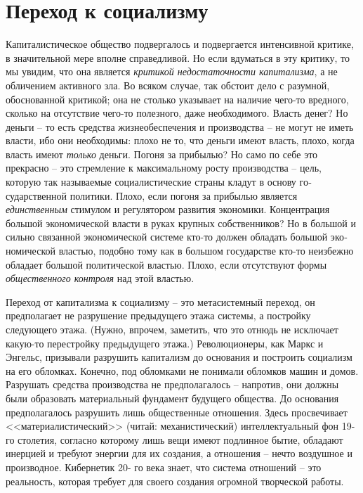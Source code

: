 \documentclass{book}
\begin{document}
\section{Переход к социализму}

Капиталистическое общество подвергалось и подвергается интенсивной критике, в значительной мере вполне справедли­вой. Но если вдуматься в эту критику, то мы увидим, что она является \textit{критикой недостаточности капитализма},  а не обличе­нием активного зла. Во всяком случае, так обстоит дело с ра­зумной, обоснованной критикой; она не столько указывает на наличие чего-то вредного, сколько на отсутствие чего-то полезного, даже необходимого. Власть денег? Но деньги -- то есть средства жизнеобеспечения и производства -- не могут не иметь власти, ибо они необходимы: плохо не то, что деньги имеют власть, плохо, когда власть имеют \textit{только}  деньги. По­гоня за прибылью? Но само по себе это прекрасно -- это стрем­ление к максимальному росту производства -- цель, которую так называемые социалистические страны кладут в основу го­сударственной политики. Плохо, если погоня за прибылью яв­ляется \textit{единственным}  стимулом и регулятором развития эко­номики. Концентрация большой экономической власти в руках 
крупных собственников? Но в 
большой и сильно связанной экономической системе кто-то должен обладать большой эко­номической властью, подобно тому как в большом государст­ве кто-то неизбежно обладает большой политической властью. Плохо, если отсутствуют формы \textit{общественного контроля}  над этой властью.

Переход от капитализма к социализму -- это метасистемный переход, он предполагает не 
разрушение предыдущего этажа системы, а постройку следующего этажа. (Нужно, впрочем,
заметить, что это отнюдь не исключает какую-то перестройку предыдущего этажа.) 
Революционеры, как Маркс и Энгельс, призывали разрушить капитализм до основания и 
построить социализм на его обломках. Конечно, под обломками не пони­мали обломков 
машин и домов. Разрушать средства произ­водства не предполагалось -- напротив, они 
должны были обра­зовать материальный фундамент будущего общества. До осно­вания  
предполагалось разрушить лишь общественные отно­шения. Здесь просвечивает 
<<материалистический>> (читай: меха­нистический) интеллектуальный фон 19-го столетия, 
согласно которому лишь вещи имеют подлинное бытие, обладают инер­цией и требуют 
энергии для их создания, а отношения -- нечто воздушное и производное. Кибернетик 20-
го века знает, что система отношений -- это реальность, которая требует для своего 
создания огромной творческой работы. 
\end{document}
